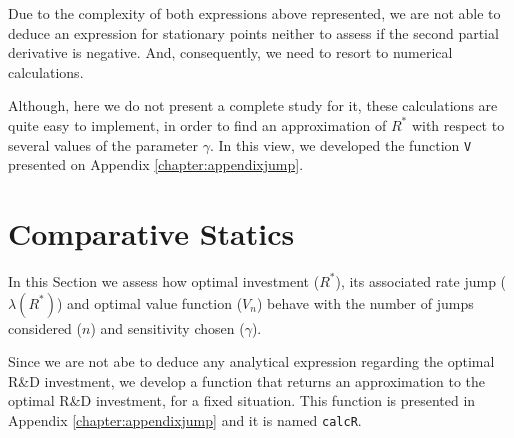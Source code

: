 Due to the complexity of both expressions above represented, we are not able to deduce an expression for stationary points neither to assess if the second partial derivative is negative. And, consequently, we need to resort to numerical calculations.


Although, here we do not present a complete study for it, these calculations are quite easy to implement, in order to find an approximation of $R^*$ with respect to several values of the parameter $\gamma$. In this view, we developed the function \texttt{V} presented on Appendix \ref{chapter:appendixjump}.














\section{Comparative Statics}
\label{maximexp_cs}

In this Section we assess how optimal investment ($R^*$), its associated rate jump ($\lambda(R^*)$) and optimal value function ($V_n$) behave with the number of jumps considered ($n$) and sensitivity chosen ($\gamma$).


Since we are not abe to deduce any analytical expression regarding the optimal R\&D investment, we develop a function that returns an approximation to the optimal R\&D investment, for a fixed situation. This function is presented in Appendix \ref{chapter:appendixjump} and it is named \texttt{calcR}.

